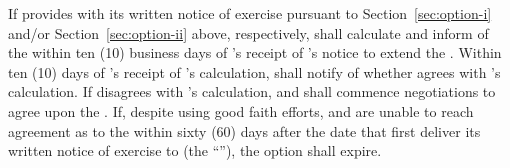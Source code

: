 If \lessee provides \lessor with its written notice of exercise pursuant to Section~\ref{sec:option-i} and/or Section~\ref{sec:option-ii} above, respectively, \lessor shall calculate and inform \lessee of the \fairMarketValue within ten (10) business days of \lessor's receipt of \lessee's notice to extend the \termOfLease. Within ten (10) days of \lessee's receipt of \lessor's calculation, \lessee shall notify \lessor of whether \lessee agrees with \lessor's calculation. If \lessee disagrees with \lessor's calculation, \lessor and \lessee shall commence negotiations to agree upon the \fairMarketValue. If, despite using good faith efforts, \lessor and \lessee are unable to reach agreement as to the \fairMarketValue within sixty (60) days after the date that \lessee first deliver its written notice of exercise to \lessor (the ``''), the option shall expire.
